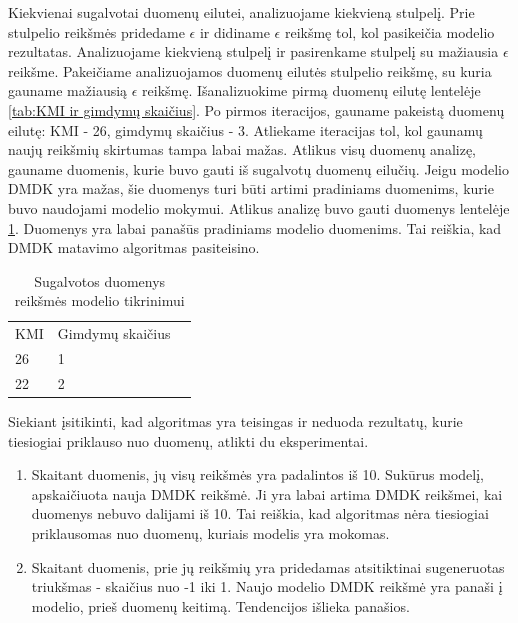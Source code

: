 \documentclass{VUMIFInfBakalaurinis}
\begin{document}
\par Kiekvienai sugalvotai duomenų eilutei, analizuojame kiekvieną stulpelį. Prie stulpelio reikšmės pridedame $\epsilon$ ir didiname $\epsilon$ reikšmę tol, kol pasikeičia modelio rezultatas. Analizuojame kiekvieną stulpelį ir pasirenkame stulpelį su mažiausia $\epsilon$ reikšme. Pakeičiame analizuojamos duomenų eilutės stulpelio reikšmę, su kuria gauname mažiausią $\epsilon$ reikšmę. Išanalizuokime pirmą duomenų eilutę lentelėje \ref{tab:KMI ir gimdymų skaičius}. Po pirmos iteracijos, gauname pakeistą duomenų eilutę: KMI - 26, gimdymų skaičius - 3. Atliekame iteracijas tol, kol gaunamų naujų reikšmių skirtumas tampa labai mažas. Atlikus visų duomenų analizę, gauname duomenis, kurie buvo gauti iš sugalvotų duomenų eilučių. Jeigu modelio DMDK yra mažas, šie duomenys turi būti artimi pradiniams duomenims, kurie buvo naudojami modelio mokymui. Atlikus analizę buvo gauti duomenys lentelėje \ref{tab:Duomenu tikrinimas}. Duomenys yra labai panašūs pradiniams modelio duomenims. Tai reiškia, kad DMDK matavimo algoritmas pasiteisino.

\begin{table}[h]
\centering
\begin{tabular}{|l|l|l|}
\cline{1-2}
KMI & Gimdymų skaičius \\\cline{1-2}
26      & 1 \\\cline{1-2}
22       & 2 \\\cline{1-2}
\end{tabular}
\caption{Sugalvotos duomenys reikšmės modelio tikrinimui}
\label{tab:Duomenu tikrinimas}
\end{table}

\par Siekiant įsitikinti, kad algoritmas yra teisingas ir neduoda rezultatų, kurie tiesiogiai priklauso nuo duomenų, atlikti du eksperimentai.

\begin{enumerate}
    \item Skaitant duomenis, jų visų reikšmės yra padalintos iš 10. Sukūrus modelį, apskaičiuota nauja DMDK reikšmė. Ji yra labai artima DMDK reikšmei, kai duomenys nebuvo dalijami iš 10. Tai reiškia, kad algoritmas nėra tiesiogiai priklausomas nuo duomenų, kuriais modelis yra mokomas.
    \item Skaitant duomenis, prie jų reikšmių yra pridedamas atsitiktinai sugeneruotas triukšmas - skaičius nuo -1 iki 1. Naujo modelio DMDK reikšmė yra panaši į modelio, prieš duomenų keitimą. Tendencijos išlieka panašios.
\end{enumerate}
\end{document}

